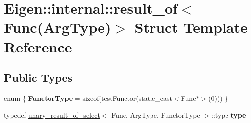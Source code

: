 \hypertarget{struct_eigen_1_1internal_1_1result__of_3_01_func_07_arg_type_08_4}{}\section{Eigen\+::internal\+::result\+\_\+of$<$ Func(Arg\+Type)$>$ Struct Template Reference}
\label{struct_eigen_1_1internal_1_1result__of_3_01_func_07_arg_type_08_4}
\subsection*{Public Types}
\begin{DoxyCompactItemize}
\item 
\mbox{\label{struct_eigen_1_1internal_1_1result__of_3_01_func_07_arg_type_08_4_a484392c34211e355b77ebef3417c17ab}} 
enum \{ {\bfseries Functor\+Type} = sizeof(test\+Functor(static\+\_\+cast$<$Func$\ast$$>$(0)))
 \}
\item 
\mbox{\label{struct_eigen_1_1internal_1_1result__of_3_01_func_07_arg_type_08_4_ac23c3f75efcfbe8eee643401440fde84}} 
typedef \mbox{\hyperlink{struct_eigen_1_1internal_1_1unary__result__of__select}{unary\+\_\+result\+\_\+of\+\_\+select}}$<$ Func, Arg\+Type, Functor\+Type $>$\+::type {\bfseries type}
\end{DoxyCompactItemize}

